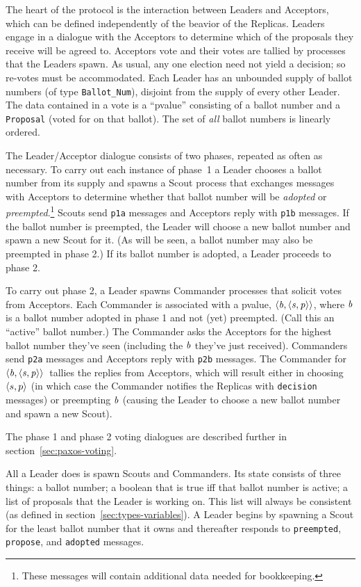 \documentclass[final]{article}
\newcommand{\bsp}{\mbox{$\NUPRLpair{\NUPRL{b}}{\NUPRLpair{\NUPRL{s}}{\NUPRL{p}}}$}}
\begin{document}
The heart of the protocol is the interaction between Leaders and
Acceptors, which can be defined independently of the beavior of the
Replicas.  Leaders engage in a dialogue with the Acceptors to
determine which of the proposals they receive will be agreed to.
Acceptors vote and their votes are tallied by processes that the
Leaders spawn.  As usual, any one election need not yield a decision;
so re-votes must be accommodated.  Each Leader has an unbounded supply
of ballot numbers (of type \lstinline{Ballot_Num}), disjoint from the
supply of every other Leader.  The data contained in a vote is a
``pvalue'' consisting of a ballot number and a \lstinline{Proposal}
(voted for on that ballot).  The set of \emph{all} ballot numbers is
linearly ordered.

The Leader/Acceptor dialogue consists of two phases, repeated as often
as necessary.  To carry out each instance of phase~1 a Leader chooses
a ballot number from its supply and spawns a Scout process that
exchanges messages with Acceptors to determine whether that ballot
number will be \emph{adopted} or \emph{preempted}.\footnote{These
  messages will contain additional data needed for bookkeeping.}
Scouts send \lstinline{p1a} messages and Acceptors reply with
\lstinline{p1b} messages.  If the ballot number is preempted, the
Leader will choose a new ballot number and spawn a new Scout for it.
(As will be seen, a ballot number may also be preempted in phase 2.)
If its ballot number is adopted, a Leader proceeds to phase 2.

To carry out phase 2, a Leader spawns Commander processes that solicit
votes from Acceptors.  Each Commander is associated with a pvalue,
\bsp, where $\mathit{b}$ is a ballot number adopted in phase 1 and not
(yet) preempted.  (Call this an ``active'' ballot number.)  The Commander
asks the Acceptors for the highest ballot number they've seen
(including the $\mathit{b}$ they've just received).  Commanders send
\lstinline{p2a} messages and Acceptors reply with \lstinline{p2b}
messages.  The Commander for \bsp\ tallies the replies from
Acceptors, which will result either in choosing $\langle s,p\rangle$ (in
which case the Commander notifies the Replicas with
\lstinline{decision} messages) or preempting $\mathit{b}$ (causing the
Leader to choose a new ballot number and spawn a new Scout).

The phase 1 and phase 2 voting dialogues are described further in
section~\ref{sec:paxos-voting}.

\vspace{1.0ex} All a Leader does is spawn Scouts and Commanders.  Its
state consists of three things: a ballot number; a boolean that is
true iff that ballot number is active; a list of proposals that the
Leader is working on.  This list will always be consistent (as defined
in section~\ref{sec:types-variables}).  A Leader begins by spawning a
Scout for the least ballot number that it owns and thereafter responds
to \lstinline{preempted}, \lstinline{propose}, and \lstinline{adopted}
messages.
\end{document}
